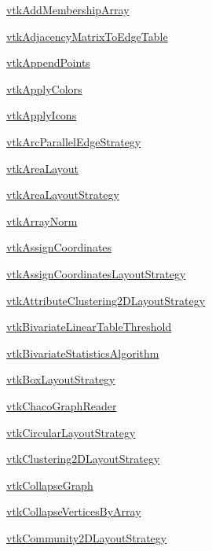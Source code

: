 
\begin{DoxyItemize}
\item \hyperlink{vtkinfovis_vtkaddmembershiparray}{vtk\-Add\-Membership\-Array}  
\item \hyperlink{vtkinfovis_vtkadjacencymatrixtoedgetable}{vtk\-Adjacency\-Matrix\-To\-Edge\-Table}  
\item \hyperlink{vtkinfovis_vtkappendpoints}{vtk\-Append\-Points}  
\item \hyperlink{vtkinfovis_vtkapplycolors}{vtk\-Apply\-Colors}  
\item \hyperlink{vtkinfovis_vtkapplyicons}{vtk\-Apply\-Icons}  
\item \hyperlink{vtkinfovis_vtkarcparalleledgestrategy}{vtk\-Arc\-Parallel\-Edge\-Strategy}  
\item \hyperlink{vtkinfovis_vtkarealayout}{vtk\-Area\-Layout}  
\item \hyperlink{vtkinfovis_vtkarealayoutstrategy}{vtk\-Area\-Layout\-Strategy}  
\item \hyperlink{vtkinfovis_vtkarraynorm}{vtk\-Array\-Norm}  
\item \hyperlink{vtkinfovis_vtkassigncoordinates}{vtk\-Assign\-Coordinates}  
\item \hyperlink{vtkinfovis_vtkassigncoordinateslayoutstrategy}{vtk\-Assign\-Coordinates\-Layout\-Strategy}  
\item \hyperlink{vtkinfovis_vtkattributeclustering2dlayoutstrategy}{vtk\-Attribute\-Clustering2\-D\-Layout\-Strategy}  
\item \hyperlink{vtkinfovis_vtkbivariatelineartablethreshold}{vtk\-Bivariate\-Linear\-Table\-Threshold}  
\item \hyperlink{vtkinfovis_vtkbivariatestatisticsalgorithm}{vtk\-Bivariate\-Statistics\-Algorithm}  
\item \hyperlink{vtkinfovis_vtkboxlayoutstrategy}{vtk\-Box\-Layout\-Strategy}  
\item \hyperlink{vtkinfovis_vtkchacographreader}{vtk\-Chaco\-Graph\-Reader}  
\item \hyperlink{vtkinfovis_vtkcircularlayoutstrategy}{vtk\-Circular\-Layout\-Strategy}  
\item \hyperlink{vtkinfovis_vtkclustering2dlayoutstrategy}{vtk\-Clustering2\-D\-Layout\-Strategy}  
\item \hyperlink{vtkinfovis_vtkcollapsegraph}{vtk\-Collapse\-Graph}  
\item \hyperlink{vtkinfovis_vtkcollapseverticesbyarray}{vtk\-Collapse\-Vertices\-By\-Array}  
\item \hyperlink{vtkinfovis_vtkcommunity2dlayoutstrategy}{vtk\-Community2\-D\-Layout\-Strategy}  

\end{DoxyItemize}
